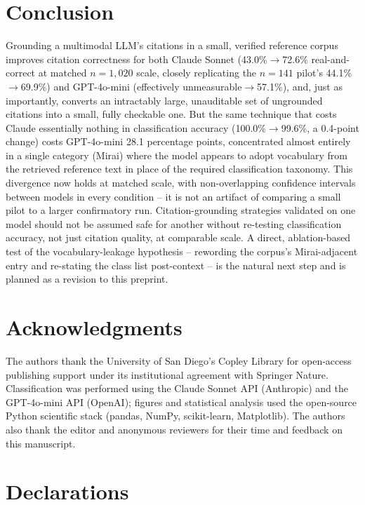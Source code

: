 \documentclass[twocolumn]{svjour3}
\begin{document}
\section{Conclusion}

Grounding a multimodal LLM's citations in a small, verified reference corpus improves citation
correctness for both Claude Sonnet (43.0\%$\to$72.6\% real-and-correct at matched $n=1{,}020$
scale, closely replicating the $n=141$ pilot's 44.1\%$\to$69.9\%) and GPT-4o-mini (effectively
unmeasurable$\to$57.1\%), and, just as importantly, converts an intractably large, unauditable set
of ungrounded citations into a small, fully checkable one. But the same technique that costs
Claude essentially nothing in classification accuracy (100.0\%$\to$99.6\%, a 0.4-point change)
costs GPT-4o-mini 28.1 percentage points, concentrated almost entirely in a single category
(Mirai) where the model appears to adopt vocabulary from the retrieved reference text in place of
the required classification taxonomy. This divergence now holds at matched scale, with
non-overlapping confidence intervals between models in every condition -- it is not an artifact of
comparing a small pilot to a larger confirmatory run. Citation-grounding strategies validated on
one model should not be assumed safe for another without re-testing classification accuracy, not
just citation quality, at comparable scale. A direct, ablation-based test of the
vocabulary-leakage hypothesis -- rewording the corpus's Mirai-adjacent entry and re-stating the
class list post-context -- is the natural next step and is planned as a revision to this
preprint.

\section*{Acknowledgments}

The authors thank the University of San Diego's Copley Library for open-access publishing
support under its institutional agreement with Springer Nature. Classification was performed
using the Claude Sonnet API (Anthropic) and the GPT-4o-mini API (OpenAI); figures and statistical
analysis used the open-source Python scientific stack (pandas, NumPy, scikit-learn, Matplotlib).
The authors also thank the editor and anonymous reviewers for their time and feedback on this
manuscript.

\section*{Declarations}
\end{document}
